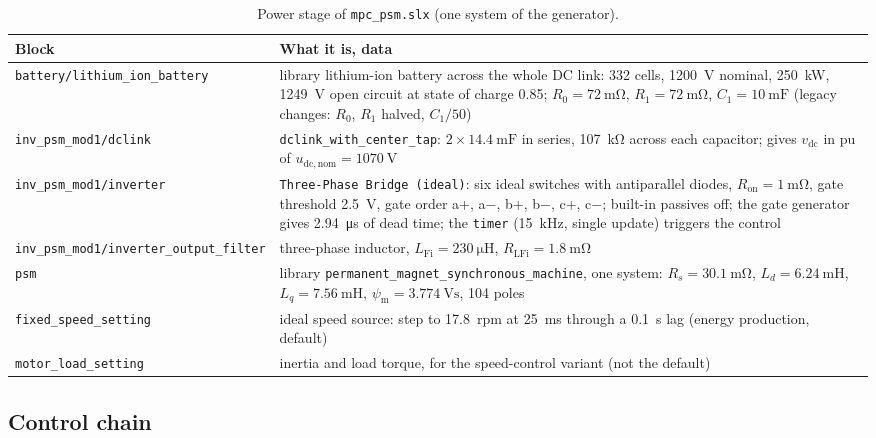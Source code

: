 \documentclass[11pt,a4paper]{scrartcl}
\newcommand{\ped}[1]{_{\mathrm{#1}}}
\newcommand{\code}[1]{\texttt{#1}}
\begin{document}
\begin{onehalfspace}
\begin{table}[H]
	\centering
	\footnotesize
	\caption{Power stage of \code{mpc\_psm.slx} (one system of the generator).}
	\label{tab:power}
	\begin{tabularx}{\textwidth}{@{} >{\raggedright\arraybackslash}p{4.6cm} X @{}}
		\toprule
		\textbf{Block} & \textbf{What it is, data} \\
		\midrule
		\code{battery/lithium\_ion\_battery} & library lithium-ion battery across the whole DC link: 332 cells, \SI{1200}{\volt} nominal, \SI{250}{\kilo\watt}, \SI{1249}{\volt} open circuit at state of charge 0.85; $R_0 = \SI{72}{\milli\ohm}$, $R_1 = \SI{72}{\milli\ohm}$, $C_1 = \SI{10}{\milli\farad}$ (legacy changes: $R_0$, $R_1$ halved, $C_1/50$) \\
		\code{inv\_psm\_mod1/dclink} & \code{dclink\_with\_center\_tap}: $2\times\SI{14.4}{\milli\farad}$ in series, \SI{107}{\kilo\ohm} across each capacitor; gives $v\ped{dc}$ in pu of $u\ped{dc,nom} = \SI{1070}{\volt}$ \\
		\code{inv\_psm\_mod1/inverter} & \code{Three-Phase Bridge (ideal)}: six ideal switches with antiparallel diodes, $R\ped{on} = \SI{1}{\milli\ohm}$, gate threshold \SI{2.5}{\volt}, gate order a+, a$-$, b+, b$-$, c+, c$-$; built-in passives off; the gate generator gives \SI{2.94}{\micro\second} of dead time; the \code{timer} (\SI{15}{\kilo\hertz}, single update) triggers the control \\
		\code{inv\_psm\_mod1/}\newline\code{inverter\_output\_filter} & three-phase inductor, $L\ped{Fi} = \SI{230}{\micro\henry}$, $R\ped{LFi} = \SI{1.8}{\milli\ohm}$ \\
		\code{psm} & library \code{permanent\_magnet\_synchronous\_machine}, one system: $R_s = \SI{30.1}{\milli\ohm}$, $L_d = \SI{6.24}{\milli\henry}$, $L_q = \SI{7.56}{\milli\henry}$, $\psi\ped{m} = \SI{3.774}{\volt\second}$, 104 poles \\
		\code{fixed\_speed\_setting} & ideal speed source: step to \SI{17.8}{rpm} at \SI{25}{\milli\second} through a \SI{0.1}{\second} lag (energy production, default) \\
		\code{motor\_load\_setting} & inertia and load torque, for the speed-control variant (not the default) \\
		\bottomrule
	\end{tabularx}
\end{table}

\subsection{Control chain}
\label{sec:chain}


\end{onehalfspace}
\end{document}
